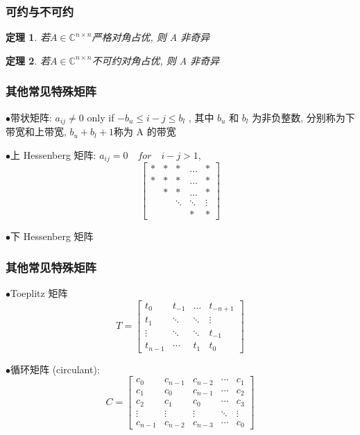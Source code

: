 \documentclass[notheorems,serif]{beamer}
\newcommand{\hei}[1]{{\HEI#1}}
\newtheorem{theorem}{\hei{定理}}
\begin{document}
\begin{frame}
\frametitle{可约与不可约}
\begin{theorem}
	若$A \in \mathbb{C}^{n \times n}$严格对角占优, 则 A 非奇异	
\end{theorem}

\begin{theorem}
	若$A \in \mathbb{C}^{n \times n}$不可约对角占优, 则 A 非奇异	
\end{theorem}
\end{frame}

\begin{frame}
\frametitle{其他常见特殊矩阵}
$\bullet$带状矩阵:
$a_{i j} \neq 0$ only if $-b_{u} \leq i-j \leq b_{l}$
, 其中 $b_u$ 和 $b_l$ 为非负整数, 分别称为下
带宽和上带宽, $b_u + b_l + 1 $称为 A 的带宽

$\bullet$上 Hessenberg 矩阵: $a_{ij} = 0\quad for\quad i - j > 1$,
$$
\left[\begin{array}{ccccc}{*} & {*} & {*} & {\dots} & {*} \\ {*} & {*} & {*} & {\dots} & {*} \\ { } & {*} & {*} & {\dots} & {*} \\ { } & { } & {\ddots} & {\ddots} & {\vdots}\\ { } & { } & { } & {*} & {*}\end{array}\right]
$$

$\bullet$下 Hessenberg 矩阵
\end{frame}

\begin{frame}
\frametitle{其他常见特殊矩阵}
$\bullet$Toeplitz 矩阵
$$
T=\left[\begin{array}{cccc}{t_{0}} & {t_{-1}} & {\dots} & {t_{-n+1}} \\ {t_{1}} & {\ddots} & {\ddots} & {\vdots} \\ {\vdots} & {\ddots} & {\ddots} & {t_{-1}} \\ {t_{n-1}} & {\cdots} & {t_{1}} & {t_{0}}\end{array}\right]
$$

$\bullet$循环矩阵 (circulant):
$$
C=\left[\begin{array}{ccccc}{c_{0}} & {c_{n-1}} & {c_{n-2}} & {\cdots} & {c_{1}} \\ {c_{1}} & {c_{0}} & {c_{n-1}} & {\cdots} & {c_{2}} \\ {c_{2}} & {c_{1}} & {c_{0}} & {\cdots} & {c_{3}} \\ {\vdots} & {\vdots} & {\vdots} & {\ddots} & {\vdots} \\ {c_{n-1}} & {c_{n-2}} & {c_{n-3}} & {\cdots} & {c_{0}}\end{array}\right]
$$
\end{frame}
\end{document}

